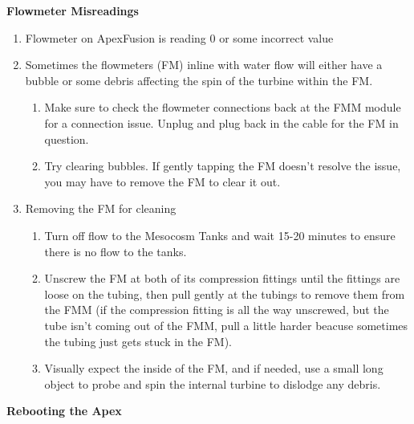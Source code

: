 \documentclass[
]{book}
\providecommand{\tightlist}{%
  \setlength{\itemsep}{0pt}\setlength{\parskip}{0pt}}
\begin{document}
\textbf{Flowmeter Misreadings}

\begin{enumerate}
\def\labelenumi{\arabic{enumi}.}
\tightlist
\item
  Flowmeter on ApexFusion is reading 0 or some incorrect value
\item
  Sometimes the flowmeters (FM) inline with water flow will either have a bubble or some debris affecting the spin of the turbine within the FM.

  \begin{enumerate}
  \def\labelenumii{\arabic{enumii}.}
  \tightlist
  \item
    Make sure to check the flowmeter connections back at the FMM module for a connection issue. Unplug and plug back in the cable for the FM in question.
  \item
    Try clearing bubbles. If gently tapping the FM doesn't resolve the issue, you may have to remove the FM to clear it out.
  \end{enumerate}
\item
  Removing the FM for cleaning

  \begin{enumerate}
  \def\labelenumii{\arabic{enumii}.}
  \tightlist
  \item
    Turn off flow to the Mesocosm Tanks and wait 15-20 minutes to ensure there is no flow to the tanks.
  \item
    Unscrew the FM at both of its compression fittings until the fittings are loose on the tubing, then pull gently at the tubings to remove them from the FMM (if the compression fitting is all the way unscrewed, but the tube isn't coming out of the FMM, pull a little harder beacuse sometimes the tubing just gets stuck in the FM).
  \item
    Visually expect the inside of the FM, and if needed, use a small long object to probe and spin the internal turbine to dislodge any debris.
  \end{enumerate}
\end{enumerate}

\textbf{Rebooting the Apex}
\end{document}
